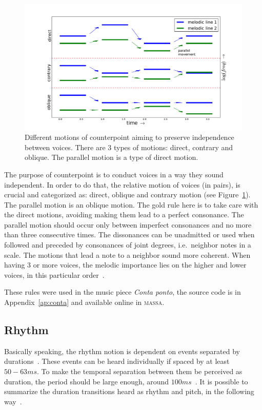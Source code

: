 \documentclass[
 aip,
 jmp,
 amsmath,amssymb,
 reprint,
]{revtex4-1}
\newcommand{\massa}{{\large \textsc{massa}}}
\begin{document}
\begin{figure}[h!]
    \centering
        \includegraphics[width=\columnwidth]{figures/movContraponto}
    \caption{Different motions of counterpoint aiming to preserve independence
        between voices. There are 3 types of motions: direct, contrary and
        oblique. The parallel motion is a type of direct motion.}
        \label{fig:movContraponto}
\end{figure}

The purpose of counterpoint is to conduct voices in a way they sound
independent. In order to do that, the relative motion of voices (in pairs), is crucial and
categorized as: direct, oblique and contrary motion (see Figure~\ref{fig:movContraponto}). The parallel motion is an oblique motion.
The gold rule here is to take care with the direct motions, avoiding making them
lead to a perfect consonance. The parallel motion should occur only between
imperfect consonances and no more than three consecutive times. The dissonances
can be unadmitted or used when followed and preceded by consonances of joint
degrees, i.e.\ neighbor notes in a scale. The motions that lead a note to a
neighbor sound more coherent. When having 3 or more voices, the melodic
importance lies on the higher and lower voices, in this particular
order~\cite{Fux,Tragtenberg,SchoenbergContra}.

These rules were used in the music piece \emph{Conta ponto}, the source code is
in Appendix~\ref{ap:conta} and available online in \massa.

\subsection{Rhythm}\label{subsec:ritmo}

Basically speaking, the rhythm notion is dependent on events separated by durations~\cite{Lacerda}. These events can be heard individually if spaced by at least $50-63ms$. To make the temporal separation between them be perceived as duration, the period should be large enough, around $100ms$~\cite{microsound}.  
It is possible to summarize the duration transitions heard as rhythm and pitch,
in the following way~\cite{Alfaix, microsound}.
\end{document}
